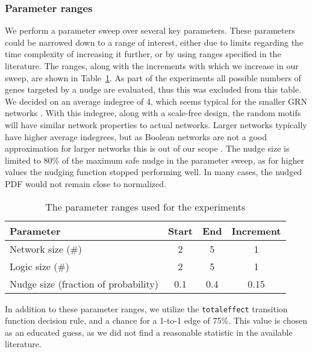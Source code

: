 \documentclass[../main.tex]{subfiles}
\begin{document}
\subsubsection{Parameter ranges}

We perform a parameter sweep over several key parameters.
These parameters could be narrowed down to a range of interest, either due to limits regarding the time complexity of increasing it further, or by using ranges specified in the literature.
The ranges, along with the increments with which we increase in our sweep, are shown in Table~\ref{parameters}.
As part of the experiments all possible numbers of genes targeted by a nudge are evaluated, thus this was excluded from this table.
We decided on an average indegree of 4, which seems typical for the smaller GRN networks \cite{lahdesmaki2003learning}.
With this indegree, along with a scale-free design, the random motifs will have similar network properties to actual networks.
Larger networks typically have higher average indegrees, but as Boolean networks are not a good approximation for larger networks this is out of our scope \cite{karlebach2008modelling, lahdesmaki2003learning}.
The nudge size is limited to 80\% of the maximum safe nudge in the parameter sweep, as for higher values the nudging function stopped performing well.
In many cases, the nudged PDF would not remain close to normalized.

\begin{table}[H]
\begin{tabular}{| l | c | c | c |}
\hline
Parameter & Start & End & Increment \\
\hline
Network size (\#) & 2 & 5 & 1 \\
Logic size (\#) & 2 & 5 & 1 \\
Nudge size (fraction of probability) & 0.1 & 0.4 & 0.15 \\
\hline
\end{tabular}
\centering
\caption{The parameter ranges used for the experiments}
\label{parameters}
\end{table}

In addition to these parameter ranges, we utilize the \texttt{totaleffect} transition function decision rule, and a chance for a 1-to-1 edge of 75\%.
This value is chosen as an educated guess, as we did not find a reasonable statistic in the available literature.
\end{document}
